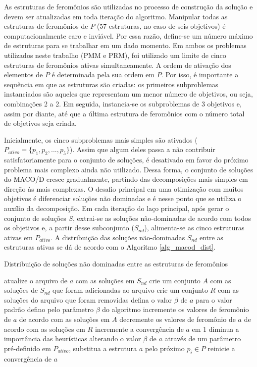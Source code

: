 As estruturas de feromônios são utilizadas no processo de construção da solução e devem ser atualizadas em toda iteração do algoritmo. Manipular todas as estruturas de feromônios de $P$ (57 estruturas, no caso de seis objetivos) é computacionalmente caro e inviável. Por essa razão, define-se um número máximo de estruturas para se trabalhar em um dado momento. Em ambos os problemas utilizados neste trabalho (PMM e PRM), foi utilizado um limite de cinco estruturas de feromônios ativas simultaneamente. A ordem de ativação dos elementos de $P$ é determinada pela sua ordem em $P$. Por isso, é importante a sequência em que as estruturas são criadas: os primeiros subproblemas instanciados são aqueles que representam um menor número de  objetivos, ou seja, combinações 2 a 2. Em seguida, instancia-se os subproblemas de 3 objetivos e, assim por diante, até que a última estrutura de feromônios com o número total de objetivos seja criada.

Inicialmente, os cinco subproblemas mais simples são ativados ($P_{ativo} = \{p_1, p_2, ..., p_5\}$). Assim que algum deles passa a não contribuir satisfatoriamente para o conjunto de soluções, é desativado em favor do próximo problema mais complexo ainda não utilizado. Dessa forma, o conjunto de soluções do MACO/D cresce gradualmente, partindo das decomposições mais simples em direção às mais complexas. O desafio principal em uma otimização com muitos objetivos é diferenciar soluções não dominadas e é nesse ponto que se utiliza o auxílio da decomposição. Em cada iteração do laço principal, após gerar o conjunto de soluções $S$, extrai-se as soluções não-dominadas de acordo com todos os objetivos e, a partir desse subconjunto ($S_{nd}$), alimenta-se as cinco estruturas ativas em $P_{ativo}$. A distribuição das soluções não-dominadas $S_{nd}$ entre as estruturas ativas se dá de acordo com o Algoritmo \ref{alg_macod_dist}.

\begin{algorithm}
	\caption{Distribuição de soluções não dominadas entre as estruturas de feromônios}
	\label{alg_macod_dist}
	\begin{algorithmic}[1]
			\State atualize o arquivo de $a$ com as soluções em $S_{nd}$
			\State crie um conjunto $A$ com as soluções de $S_{nd}$ que foram adicionadas ao arquivo
			\State crie um conjunto $R$ com as soluções do arquivo que foram removidas
				\State defina o valor $\beta$ de $a$ para o valor padrão defino pelo parâmetro $\beta$ do algoritmo
				\State incremente os valores de feromônio de $a$ de acordo com as soluções em $A$
				\State decremente os valores de feromônio de $a$ de acordo com as soluções em $R$
			\Else
				\State incremente a convergência de $a$ em 1
				\State diminua a importância das heurísticas alterando o valor $\beta$ de $a$ através de um parâmetro pré-definido
					\State em $P_{ativo}$, substitua a estrutura $a$ pelo próximo $p_i \in P$
					\State reinicie a convergência de $a$
				\EndIf
			\EndIf
		\EndFor
	\end{algorithmic}
\end{algorithm}

